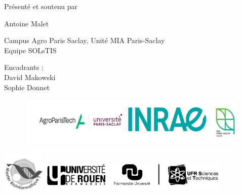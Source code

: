\documentclass{book}
\begin{document}
\begin{center}
    \large{Présenté et soutenu par}
\end{center}

\begin{center}
    \huge{Antoine Malet}
\end{center}

\begin{center}
    \vspace{1.5cm}
    \Large{Campus Agro Paris Saclay, Unité MIA Paris-Saclay} \\
    \Large{Equipe SOLsTIS}
\end{center}

\begin{center}
    \vspace{0.5cm}
    \large{Encadrants :} \\
    \vspace{0.5cm}
    \large{David Makowski} \\
    \large{Sophie Donnet}
\end{center}

\vspace{1.2cm}
\begin{center}
    \includegraphics[height=2.3cm, width=15cm]{logos.png}
\end{center}

\newpage
\thispagestyle{empty}
\mbox{} %


\newpage
\thispagestyle{empty}
\vspace{-5cm}
\includegraphics[height=2cm]{univBW.png}
\hfill
\includegraphics[height=1.5cm]{URN_NU_ST_BW.png}
\end{document}
